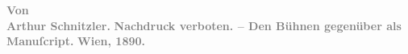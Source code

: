 \begin{ledgroupsized}[t]{13cm}
           \pstart
           \noindent{}\centering{}\textcolor{gray}{\textbf{Von}}{\\}\textcolor{gray}{\textbf{\textbf{Arthur Schnitzler.}}}\pend
           {\bigskip}\pstart
           \noindent{}\centering{}\textcolor{gray}{\textbf{Nachdruck verboten. – Den Bühnen gegenüber als Manuſcript.}}\pend
           \pstart
           \noindent{}\centering{}\textcolor{gray}{\textbf{Wien, 1890.}}\pend
           \endnumbering{}\end{ledgroupsized}  \newcommand{\dateiname}{L00011}\newcommand{\titel}{Arthur Schnitzler: Widmungsexemplar Alkandi’s Lied für Hugo von Hofmannsthal, [5.? 5. 1891]}\newcommand{\editorInnen}{Martin Anton Müller und Gerd-Hermann Susen}
      